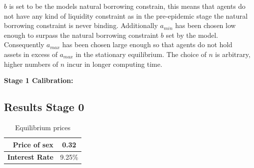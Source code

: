 $b$ is set to be the models natural borrowing constrain, this means that agents do not have any kind of liquidity constraint as in the pre-epidemic stage the natural borrowing constraint is never binding. Additionally $a_{min}$ has been chosen low enough to surpass the natural borrowing constraint $b$ set by the model. Consequently $a_{max}$ has been chosen large enough so that agents do not hold assets in excess of $a_{max}$ in the stationary equilibrium. The choice of $n$ is arbitrary, higher numbers of $n$ incur in longer computing time.



\textbf{Stage 1 Calibration:}\\




\subsection{Results Stage 0}
\begin{table}[H]
\caption{Equilibrium prices}%
\begin{center}
\begin{tabular}{r|c}
\hline%
\textbf{Price of sex} &0.32\\
\hline
\textbf{Interest Rate} & 9.25\%\\
\hline%
\end{tabular}
\end{center}
\end{table}


